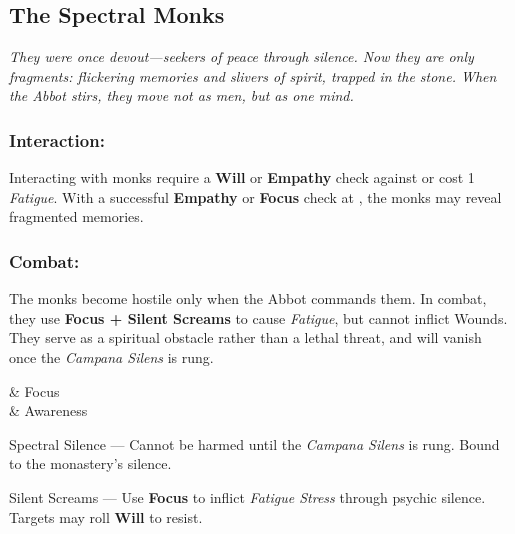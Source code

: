 \documentclass[nodeprecatedcode,bg=print]{dndbook}
\begin{document}
\subsection{The Spectral Monks}
\begin{paracol}{2}
    \raggedright

    \emph{They were once devout—seekers of peace through silence. Now they are only fragments: flickering memories and slivers of spirit, trapped in the stone. When the Abbot stirs, they move not as men, but as one mind.}

    \subsubsection*{Interaction:}
    Interacting with monks require a \textbf{Will} or \textbf{Empathy} check against  or cost 1 \emph{Fatigue}. With a successful \textbf{Empathy} or \textbf{Focus} check at , the monks may reveal fragmented memories.

    \subsubsection*{Combat:}
    The monks become hostile only when the Abbot commands them. In combat, they use \textbf{Focus + Silent Screams} to cause \emph{Fatigue}, but cannot inflict Wounds. They serve as a spiritual obstacle rather than a lethal threat, and will vanish once the \emph{Campana Silens} is rung.

    \switchcolumn\normalsize

    \begin{SkillsBox}
        \Skilled & Focus \\
        \Novice & Awareness \\
    \end{SkillsBox}

    \begin{TraitsBox}
        \item[Spectral Silence] — Cannot be harmed until the \emph{Campana Silens} is rung. Bound to the monastery's silence.
        \item[Silent Screams] — Use \textbf{Focus} to inflict \emph{Fatigue Stress} through psychic silence. Targets may roll \textbf{Will} to resist.
    \end{TraitsBox}

    \DamageBox[%
        totalfatigue=3,%
        totalmild=0,%
        totalmoderate=0,%
        totalsevere=0,%
    ]
\end{paracol}
\end{document}
